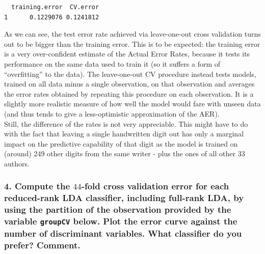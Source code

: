 \documentclass[
  letterpaper,
  DIV=11,
  numbers=noendperiod]{scrartcl}
\begin{document}
\begin{verbatim}
  training.error  CV.error
1      0.1229076 0.1241812
\end{verbatim}

As we can see, the test error rate achieved via leave-one-out cross
validation turns out to be bigger than the training error. This is to be
expected: the training error is a very over-confident estimate of the
Actual Error Rates, because it tests its performance on the same data
used to train it (so it suffers a form of ``overfitting'' to the data).
The leave-one-out CV procedure instead tests models, trained on all data
minus a single observation, on that observation and averages the error
rates obtained by repeating this procedure on each observation. It is a
slightly more realistic measure of how well the model would fare with
unseen data (and thus tends to give a less-optimistic approximation of
the AER).\\
Still, the difference of the rates is not very appreciable. This might
have to do with the fact that leaving a single handwritten digit out has
only a marginal impact on the predictive capability of that digit as the
model is trained on (around) 249 other digits from the same writer -
plus the ones of all other 33 authors.

\hypertarget{compute-the-44-fold-cross-validation-error-for-each-reduced-rank-lda-classifier-including-full-rank-lda-by-using-the-partition-of-the-observation-provided-by-the-variable-groupcv-below.-plot-the-error-curve-against-the-number-of-discriminant-variables.-what-classifier-do-you-prefer-comment.}{%
\subsubsection{\texorpdfstring{4. Compute the \(44\)-fold cross
validation error for each reduced-rank LDA classifier, including
full-rank LDA, by using the partition of the observation provided by the
variable \texttt{groupCV} below. Plot the error curve against the number
of discriminant variables. What classifier do you prefer?
Comment.}{4. Compute the 44-fold cross validation error for each reduced-rank LDA classifier, including full-rank LDA, by using the partition of the observation provided by the variable groupCV below. Plot the error curve against the number of discriminant variables. What classifier do you prefer? Comment.}}\label{compute-the-44-fold-cross-validation-error-for-each-reduced-rank-lda-classifier-including-full-rank-lda-by-using-the-partition-of-the-observation-provided-by-the-variable-groupcv-below.-plot-the-error-curve-against-the-number-of-discriminant-variables.-what-classifier-do-you-prefer-comment.}}
\end{document}
